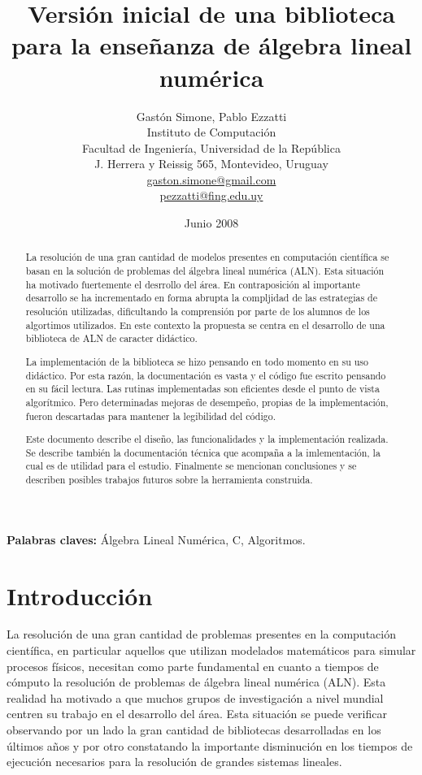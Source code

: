 \documentclass[a4paper,10pt]{article}
\title{Versión inicial de una biblioteca para la enseñanza de álgebra lineal numérica}
\author{Gastón Simone, Pablo Ezzatti\vspace{0.5cm} \\ Instituto de Computación\\ Facultad de Ingeniería, Universidad de la República\\ J. Herrera y Reissig 565, Montevideo, Uruguay\\ \url{gaston.simone@gmail.com}\\ \url{pezzatti@fing.edu.uy}}
\date{Junio 2008}
\begin{document}
\maketitle

\textbf{Palabras claves:} Álgebra Lineal Numérica, C, Algoritmos.

\begin{abstract}
 La resolución de una gran cantidad de modelos presentes en  computación científica se basan en la solución de problemas del álgebra lineal numérica (ALN). 
 Esta situación ha motivado fuertemente el desrrollo del área.
 En contraposición al importante desarrollo se ha incrementado en forma abrupta la compljidad de las estrategias de resolución utilizadas, dificultando la comprensión por parte de los alumnos de los algortimos utilizados.
 En este contexto la propuesta se centra en el desarrollo de una biblioteca de ALN de caracter didáctico. 

 La implementación de la biblioteca se hizo pensando en todo momento en su uso didáctico.
 Por esta razón, la documentación es vasta y el código fue escrito pensando en su fácil lectura. Las rutinas implementadas son eficientes desde el punto de vista algorítmico. 
 Pero determinadas mejoras de desempeño, propias de la implementación, fueron descartadas para mantener la legibilidad del código.

 Este documento describe el diseño, las funcionalidades y la implementación realizada.
 Se describe también la documentación técnica que acompaña a la imlementación, la cual es de utilidad para
el estudio. 
 Finalmente se mencionan conclusiones y se describen posibles trabajos futuros sobre la herramienta construida.
\end{abstract}

\newpage


\section{Introducción}

 La resolución de una  gran cantidad de problemas presentes en la computación científica, en particular aquellos que utilizan modelados matemáticos para simular procesos físicos, necesitan como parte fundamental en cuanto a tiempos de cómputo la resolución de problemas de álgebra lineal numérica (ALN).
 Esta realidad ha motivado a que muchos grupos de investigación a nivel mundial centren su trabajo en el desarrollo del área. 
Esta situación se puede verificar observando por un lado la gran cantidad de bibliotecas desarrolladas en los últimos años y por otro constatando la importante disminución en los tiempos de ejecución necesarios para la resolución de grandes sistemas lineales.
 
\end{document}
